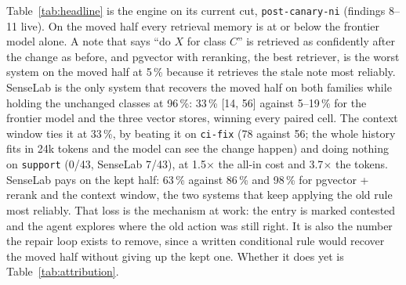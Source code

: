 \documentclass[11pt]{article}
\newcommand{\code}[1]{\texttt{#1}}
\begin{document}
Table~\ref{tab:headline} is the engine on its current cut, \code{post-canary-ni} (findings
8--11 live). On the moved half every retrieval memory is at or below the frontier model alone.
A note that says ``do $X$ for class $C$'' is retrieved as confidently after the change as before,
and pgvector with reranking, the best retriever, is the worst system on the moved half at 5\,\%
because it retrieves the stale note most reliably. SenseLab is the only system that recovers the
moved half on both families while holding the unchanged classes at 96\,\%: 33\,\% [14, 56]
against 5--19\,\% for the frontier model and the three vector stores, winning every paired cell.
The context window ties it at 33\,\%, by beating it on \code{ci-fix} (78 against 56; the whole
history fits in 24k tokens and the model can see the change happen) and doing nothing on
\code{support} (0/43, SenseLab 7/43), at 1.5$\times$ the all-in cost and 3.7$\times$ the tokens.
SenseLab pays on the kept half: 63\,\% against 86\,\% and 98\,\% for pgvector + rerank and the
context window, the two systems that keep applying the old rule most reliably. That loss is the
mechanism at work: the entry is marked contested and the agent explores where the old action was
still right. It is also the number the repair loop exists to remove, since a written conditional
rule would recover the moved half without giving up the kept one. Whether it does yet is
Table~\ref{tab:attribution}.

\begin{table}[H]
\centering\scriptsize\setlength{\tabcolsep}{3pt}
\caption{SenseLab minus each system on the moved half, per cell, in percentage points, paired on (family, seed).}
\label{tab:paired}
\end{table}
\end{document}
